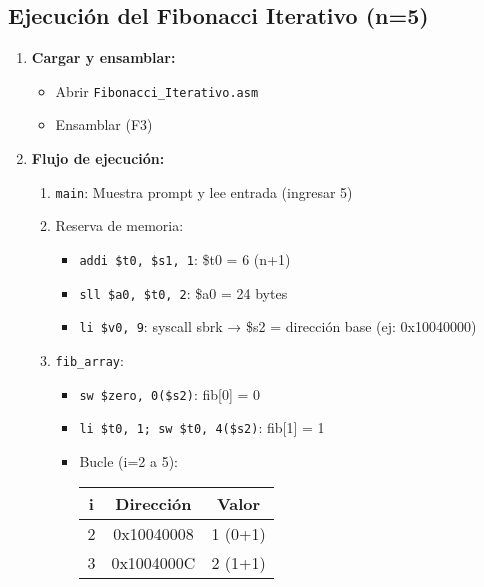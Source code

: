 \documentclass[a4paper, 12pt]{article}
\begin{document}
\subsection{Ejecución del Fibonacci Iterativo (n=5)}
\begin{enumerate}
    \item \textbf{Cargar y ensamblar:}
        \begin{itemize}
            \item Abrir \texttt{Fibonacci\_Iterativo.asm}
            \item Ensamblar (F3)
        \end{itemize}
    
    \item \textbf{Flujo de ejecución:}
        \begin{enumerate}
            \item \texttt{main}: Muestra prompt y lee entrada (ingresar 5)
            \item Reserva de memoria:
                \begin{itemize}
                    \item \texttt{addi \$t0, \$s1, 1}: \$t0 = 6 (n+1)
                    \item \texttt{sll \$a0, \$t0, 2}: \$a0 = 24 bytes
                    \item \texttt{li \$v0, 9}: syscall sbrk → \$s2 = dirección base (ej: 0x10040000)
                \end{itemize}
            \item \texttt{fib\_array}:
                \begin{itemize}
                    \item \texttt{sw \$zero, 0(\$s2)}: fib[0] = 0
                    \item \texttt{li \$t0, 1; sw \$t0, 4(\$s2)}: fib[1] = 1
                    \item Bucle (i=2 a 5):
                        \begin{table}[h]
                            \centering
                            \begin{tabular}{|c|c|c|}
                                \hline
                                \textbf{i} & \textbf{Dirección} & \textbf{Valor} \\
                                \hline
                                2 & 0x10040008 & 1 (0+1) \\
                                \hline
                                3 & 0x1004000C & 2 (1+1) \\

\end{tabular}
\end{table}
\end{itemize}
\end{enumerate}
\end{enumerate}
\end{document}
